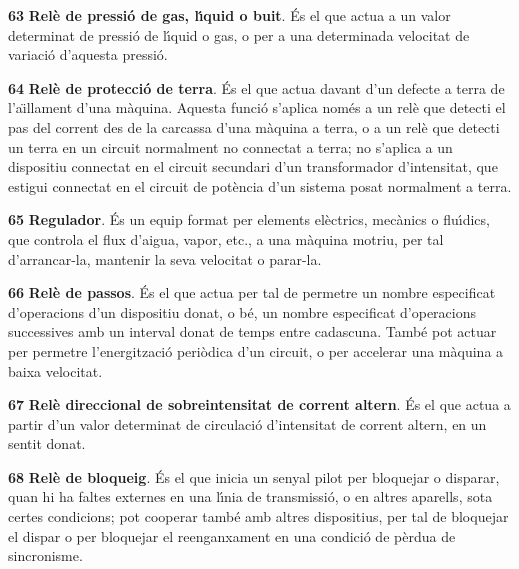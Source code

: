 \begin{multicols}{2}
\begin{list}{}
\item[\textbf{63}]  \textbf{Rel\`{e} de pressi\'{o}
de gas, l\'{\i}quid o buit}. \'{E}s el que actua a un valor determinat de
pressi\'{o} de l\'{\i}quid o gas, o per a una determinada velocitat de
variaci\'{o} d'aquesta pressi\'{o}.

\item[\textbf{64}]  \textbf{Rel\`{e} de protecci\'{o} de terra}.
\'{E}s el que actua davant d'un defecte a terra de l'a\"{\i}llament d'una
m\`{a}quina. Aquesta funci\'{o} s'aplica nom\'{e}s a un rel\`{e} que detecti el pas
del corrent des de la carcassa  d'una m\`{a}quina a terra, o a un rel\`{e}
que detecti un terra en un circuit normalment no connectat a terra;
no s'aplica a un dispositiu connectat en el circuit secundari d'un
transformador d'intensitat, que estigui connectat en el circuit de
pot\`{e}ncia d'un sistema posat normalment a terra.

\item[\textbf{65}]  \textbf{Regulador}. \'{E}s un equip format per elements
el\`{e}ctrics, mec\`{a}nics o flu\'{\i}dics,  que controla el flux d'aigua,
vapor, etc.,  a una m\`{a}quina motriu, per tal d'arrancar-la, mantenir
la seva velocitat o parar-la.

\item[\textbf{66}]  \textbf{Rel\`{e} de passos}. \'{E}s el que actua per tal
de permetre un nombre especificat d'operacions d'un dispositiu
donat, o b\'{e}, un nombre especificat d'operacions successives amb un
interval donat de temps entre cadascuna. Tamb\'{e} pot actuar per
permetre l'energitzaci\'{o} peri\`{o}dica d'un circuit, o per accelerar una
m\`{a}quina a baixa velocitat.

\item[\textbf{67}] 
\textbf{Rel\`{e} direccional de sobreintensitat de corrent altern}. \'{E}s
el que actua a partir d'un valor determinat de circulaci\'{o}
d'intensitat  de corrent altern, en un sentit donat.

\item[\textbf{68}]  \textbf{Rel\`{e} de bloqueig}. \'{E}s el que inicia un
senyal pilot per bloquejar o disparar, quan hi ha faltes externes en
una l\'{\i}nia de transmissi\'{o}, o en altres aparells, sota certes
condicions; pot cooperar tamb\'{e} amb altres dispositius, per tal de
bloquejar el dispar o per bloquejar el reenganxament en una condici\'{o}
de p\`{e}rdua de sincronisme.


\end{list}
\end{multicols}
